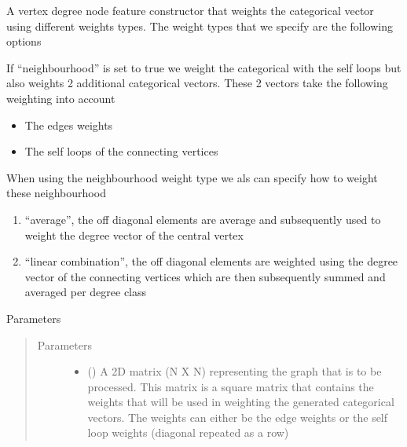 \documentclass[letterpaper,10pt,english]{sphinxmanual}
\begin{document}
\begin{fulllineitems}
\begin{fulllineitems}
\label{\detokenize{modules/gqcml.data:gqcml.data.Data.Preprocessor.vdegree_weighted_nf}}
A vertex degree node feature constructor that weights the categorical vector
using different weights types. The weight types that we specify are the following options

If “neighbourhood” is set to true we weight the categorical with the self loops but also weights 2 additional
categorical vectors. These 2 vectors take the following weighting into account
\begin{itemize}
\item {} 
The edges weights

\item {} 
The self loops of the connecting vertices\textasciigrave{}

\end{itemize}

When using the neighbourhood weight type we als can specify how to weight these neighbourhood
\begin{enumerate}
%
\item {} 
“average”, the off diagonal elements are average and subsequently used to weight
the degree vector of the central vertex

\item {} 
“linear combination”, the off diagonal elements are weighted using the degree vector
of the connecting vertices which are then subsequently summed and averaged per
degree class

\end{enumerate}

Parameters
\begin{quote}\begin{description}
\item[{Parameters}] \leavevmode\begin{itemize}
\item {} 
\sphinxstyleliteralstrong{\sphinxupquote{(}}\sphinxstyleliteralstrong{\sphinxupquote{)}} () \textendash{} A 2D matrix (N X N) representing the graph that is to be processed. This matrix
is a square matrix that contains the weights that will be used in weighting
the generated categorical vectors. The weights can either be the edge weights
or the self loop weights (diagonal repeated as a row)


\end{itemize}
\end{description}
\end{quote}
\end{fulllineitems}
\end{fulllineitems}
\end{document}
